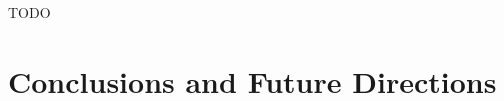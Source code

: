 \documentclass[12pt]{cmuthesis}
\begin{document}
\begin{acknowledgments}
TODO 
\end{acknowledgments}
\restoregeometry

\pagestyle{plain}

\tableofcontents
{}
\listoffigures
{}
\listoftables
\listofalgorithms

\mainmatter







\part{Conclusions and Future Directions}




\end{document}
